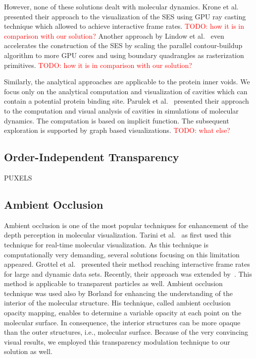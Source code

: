 However, none of these solutions dealt with molecular dynamics. 
Krone et al.~\cite{krone2009interactive} presented their approach to the visualization of the SES using GPU ray casting technique which allowed to achieve interactive frame rates. \textcolor{red}{TODO: how it is in comparison with our solution?} 
Another approach by Lindow et al.~\cite{lindow2010accelerated} even accelerates the construction of the SES by scaling the parallel contour-buildup algorithm to more GPU cores and using boundary quadrangles as rasterization primitives. \textcolor{red}{TODO: how it is in comparison with our solution?}

Similarly, the analytical approaches are applicable to the protein inner voids. 
We focus only on the analytical computation and visualization of cavities which can contain a potential protein binding site.
Parulek et al.~\cite{parulek2013visual} presented their approach to the computation and visual analysis of cavities in simulations of molecular dynamics.
The computation is based on implicit function. 
The subsequent exploration is supported by graph based visualizations.
\textcolor{red}{TODO: what else?}


\subsection{Order-Independent Transparency}
\cite{carpenter1984abuffer}
\cite{everitt2001interactive}
\cite{bavoil2008order}
\cite{yang2010real}
\cite{enderton2011stochastic}
\cite{salvi2011adaptive}
\cite{maule2012memory}%
PUXELS \cite{kauker2013rendering}


\subsection{Ambient Occlusion}
Ambient occlusion is one of the most popular techniques for enhancement of the depth perception in molecular visualization.
Tarini et al.~\cite{tarini2006ambient} as first used this technique for real-time molecular visualization.
As this technique is computationally very demanding, several solutions focusing on this limitation appeared.
Grottel et al.~\cite{grottel2012object} presented their method reaching interactive frame rates for large and dynamic data sets. 
Recently, their approach was extended by~\cite{staib2015ambient}.
This method is applicable to transparent particles as well.
Ambient occlusion technique was used also by Borland\cite{borland2011ambient} for enhancing the understanding of the interior of the molecular structure.
His technique, called ambient occlusion opacity mapping, enables to determine a variable opacity at each point on the molecular surface.
In consequence, the interior structures can be more opaque than the outer structures, i.e., molecular surface.
Because of the very convincing visual results, we employed this transparency modulation technique to our solution as well.


